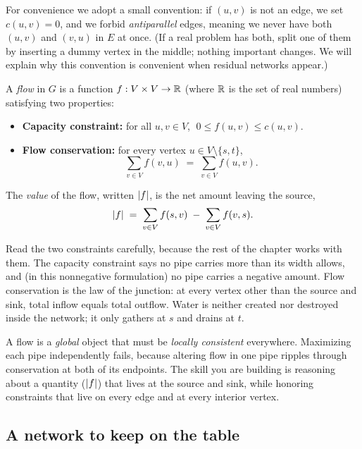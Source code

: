 For convenience we adopt a small convention: if $(u,v)$ is not an edge, we set
$c(u,v) = 0$, and we forbid \emph{antiparallel} edges, meaning we never have
both $(u,v)$ and $(v,u)$ in $E$ at once. (If a real problem has both, split one
of them by inserting a dummy vertex in the middle; nothing important changes.
We will explain why this convention is convenient when residual networks
appear.)

\begin{definition}[Flow]
\label{ch26:def-flow}
A \emph{flow} in $G$ is a function $f : V \times V \to \mathbb{R}$ (where $\mathbb{R}$ is the set of real numbers) satisfying two
properties:
\begin{itemize}
  \item \textbf{Capacity constraint:} for all $u,v \in V$,
        $\;0 \le f(u,v) \le c(u,v)$.
  \item \textbf{Flow conservation:} for every vertex $u \in V \setminus
        \{s,t\}$,
        \[
          \sum_{v \in V} f(v,u) \;=\; \sum_{v \in V} f(u,v).
        \]
\end{itemize}
The \emph{value} of the flow, written $\lvert f\rvert$, is the net amount leaving the
source,
\[
  \lvert f\rvert \;=\; \sum_{v \in V} f(s,v) \;-\; \sum_{v \in V} f(v,s).
\]
\end{definition}

Read the two constraints carefully, because the rest of the chapter works with
them. The capacity constraint says no pipe carries more than its width allows,
and (in this nonnegative formulation) no pipe carries a negative amount. Flow
conservation is the law of the junction: at every vertex other than the source
and sink, total inflow equals total outflow. Water is neither created nor
destroyed inside the network; it only gathers at $s$ and drains at $t$.

\begin{focusbox}
A flow is a \emph{global} object that must be \emph{locally consistent}
everywhere. Maximizing each pipe independently fails, because altering flow in one
pipe ripples through conservation at both of its endpoints. The skill
you are building is reasoning about a quantity ($\lvert f\rvert$) that lives at the
source and sink, while honoring constraints that live on every edge and at
every interior vertex.
\end{focusbox}

\subsection{A network to keep on the table}
\label{ch26:running-example}

